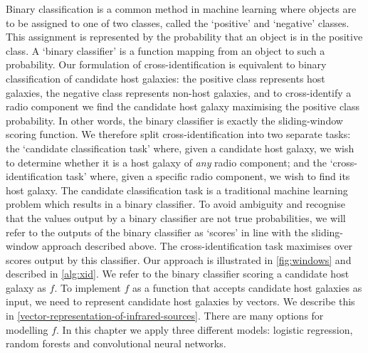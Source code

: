 \documentclass[11pt, a4paper]{book}
\begin{document}
    {Binary classification is a common method in machine learning
    where objects are to be assigned to one of two classes,
    called the `positive' and `negative' classes. This assignment is
    represented by the probability that an object is in the positive class. A
    `binary classifier' is a function mapping from an object to such a
    probability. Our formulation of cross-identification is equivalent to
    binary classification of candidate host galaxies: the positive class
    represents host galaxies, the negative class represents non-host galaxies,
    and to cross-identify a radio component we find the candidate host galaxy
    maximising the positive class probability. In other words,
    the binary classifier is exactly the sliding-window scoring function. We therefore split
    cross-identification into two separate tasks: the `candidate
    classification task' where, given a candidate host galaxy, we wish to
    determine whether it is a host galaxy of \emph{any} radio component; and
    the `cross-identification task' where, given a specific radio
    component, we wish to find its host galaxy. The candidate classification task
    is a traditional machine learning problem which results in a binary
    classifier. To avoid ambiguity and recognise that the values output by a
    binary classifier are not true probabilities, we will refer to the outputs
    of the binary classifier as `scores' in line with the sliding-window approach
    described above. The cross-identification task maximises over scores
    output by this classifier. Our approach is illustrated in
    \autoref{fig:windows} and described in \autoref{alg:xid}. We refer to the
    binary classifier scoring a candidate host galaxy as
    $f$. To implement $f$ as a function that accepts candidate host galaxies
    as input, we need to represent candidate host galaxies by vectors. We
    describe this in \autoref{vector-representation-of-infrared-sources}.
    There are many options for modelling $f$. In this chapter we apply three
    different models: logistic regression, random forests and convolutional
    neural networks.}
\end{document}
